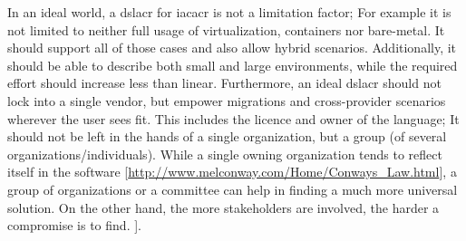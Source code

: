 \newline
In an ideal world, a \gls{dslacr} for \gls{iacacr} is not a limitation factor; For example it is not limited to neither full usage of virtualization, containers nor bare-metal. It should support all of those cases and also allow hybrid scenarios. Additionally, it should be able to describe both small and large environments, while the required effort should increase less than linear. Furthermore, an ideal \gls{dslacr} should not lock into a single vendor, but empower migrations and cross-provider scenarios wherever the user sees fit. This includes the licence and owner of the language; It should not be left in the hands of a single organization, but a group (of several organizations/individuals). While a single owning organization tends to reflect itself in the software [\url{http://www.melconway.com/Home/Conways_Law.html}], a group of organizations or a committee can help in finding a much more universal solution. On the other hand, the more stakeholders are involved, the harder a compromise is to find.
].

